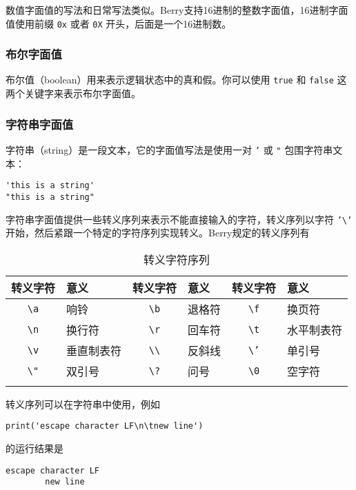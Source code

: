 数值字面值的写法和日常写法类似。Berry支持16进制的整数字面值，16进制字面值使用前缀 \texttt{0x} 或者 \texttt{0X} 开头，后面是一个16进制数。

\subsubsection{布尔字面值}

布尔值（boolean）用来表示逻辑状态中的真和假。你可以使用 \texttt{true} 和 \texttt{false} 这两个关键字来表示布尔字面值。

\subsubsection{字符串字面值}

字符串（string）是一段文本，它的字面值写法是使用一对 \texttt{'} 或 \texttt{"} 包围字符串文本：
\begin{lstlisting}[language=berry, numbers=none]
'this is a string'
"this is a string"
\end{lstlisting}

字符串字面值提供一些转义序列来表示不能直接输入的字符，转义序列以字符 \texttt{'\textbackslash'} 开始，然后紧跟一个特定的字符序列实现转义。Berry规定的转义序列有
\begin{table}[htb]
    \centering
    \setlength{\tabcolsep}{4mm}
    \begin{tabular}{clclcl} \Xhline{1pt}
        \textbf{转义字符} & \textbf{意义} & \textbf{转义字符} & \textbf{意义} & \textbf{转义字符} & \textbf{意义} \\ \hline
        \texttt{\textbackslash a} & 响铃 & \texttt{\textbackslash b} & 退格符 & \texttt{\textbackslash f} & 换页符 \\
        \texttt{\textbackslash n} & 换行符 & \texttt{\textbackslash r} & 回车符 & \texttt{\textbackslash t} & 水平制表符 \\
        \texttt{\textbackslash v} & 垂直制表符 & \texttt{\textbackslash \textbackslash} & 反斜线 & \texttt{\textbackslash '} & 单引号 \\
        \texttt{\textbackslash "} & 双引号 & \texttt{\textbackslash ?} & 问号 & \texttt{\textbackslash 0} & 空字符 \\
        \Xhline{1pt}
    \end{tabular}
    \caption{转义字符序列}
    \label{tab::escape_character}
\end{table}

转义序列可以在字符串中使用，例如
\begin{lstlisting}[language=berry, numbers=none]
print('escape character LF\n\tnew line')
\end{lstlisting}
的运行结果是
\begin{lstlisting}[numbers=none]
escape character LF
        new line
\end{lstlisting}

